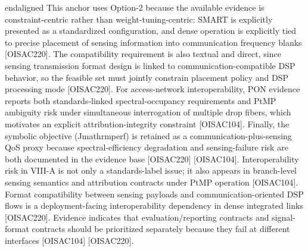 {}\markdownRendererBackslash{}end\markdownRendererLeftBrace{}aligned\markdownRendererRightBrace{}\markdownRendererSoftLineBreak
{}\markdownRendererDollarSign{}\markdownRendererDollarSign{}\markdownRendererParagraphSeparator
{}This anchor uses Option-2 because the available evidence is constraint-centric rather than weight-tuning-centric: SMART is explicitly presented as a standardized configuration, and dense operation is explicitly tied to precise placement of sensing information into communication frequency blanks [O\markdownRendererUnderscore{}ISAC\markdownRendererUnderscore{}220]. The compatibility requirement is also textual and direct, since sensing transmission format design is linked to communication-compatible DSP behavior, so the feasible set must jointly constrain placement policy and DSP processing mode [O\markdownRendererUnderscore{}ISAC\markdownRendererUnderscore{}220]. For access-network interoperability, PON evidence reports both standards-linked spectral-occupancy requirements and PtMP ambiguity risk under simultaneous interrogation of multiple drop fibers, which motivates an explicit attribution-integrity constraint [O\markdownRendererUnderscore{}ISAC\markdownRendererUnderscore{}104]. Finally, the symbolic objective (J\markdownRendererUnderscore{}\markdownRendererLeftBrace{}\markdownRendererBackslash{}mathrm\markdownRendererLeftBrace{}perf\markdownRendererRightBrace{}\markdownRendererRightBrace{}) is retained as a communication-plus-sensing QoS proxy because spectral-efficiency degradation and sensing-failure risk are both documented in the evidence base [O\markdownRendererUnderscore{}ISAC\markdownRendererUnderscore{}220] [O\markdownRendererUnderscore{}ISAC\markdownRendererUnderscore{}104].\markdownRendererInterblockSeparator
{}
\markdownRendererSectionEnd \markdownRendererSectionBegin
{}\markdownRendererInterblockSeparator
{}\markdownRendererUlBeginTight
\markdownRendererUlItem Interoperability risk in VIII-A is not only a standards-label issue; it also appears in branch-level sensing semantics and attribution contracts under PtMP operation [O\markdownRendererUnderscore{}ISAC\markdownRendererUnderscore{}104].\markdownRendererUlItemEnd 
\markdownRendererUlItem Format compatibility between sensing payloads and communication-oriented DSP flows is a deployment-facing interoperability dependency in dense integrated links [O\markdownRendererUnderscore{}ISAC\markdownRendererUnderscore{}220].\markdownRendererUlItemEnd 
\markdownRendererUlItem Evidence indicates that evaluation/reporting contracts and signal-format contracts should be prioritized separately because they fail at different interfaces [O\markdownRendererUnderscore{}ISAC\markdownRendererUnderscore{}104] [O\markdownRendererUnderscore{}ISAC\markdownRendererUnderscore{}220].\markdownRendererUlItemEnd 
